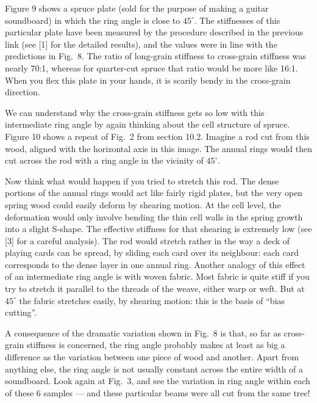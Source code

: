   Figure 9 shows a spruce plate (sold for the purpose of making a guitar 
  soundboard) in which the ring angle is close to $45^\circ$. The stiffnesses 
  of this particular plate have been measured by the procedure described in the 
  previous link (see [1] for the detailed results), and the values were in line 
  with the predictions in Fig.\ 8. The ratio of long-grain stiffness to 
  cross-grain stiffness was nearly 70:1, whereas for quarter-cut spruce that 
  ratio would be more like 16:1. When you flex this plate in your hands, it is 
  scarily bendy in the cross-grain direction. 


  We can understand why the cross-grain stiffness gets so low with this 
  intermediate ring angle by again thinking about the cell structure of spruce. 
  Figure 10 shows a repeat of Fig.\ 2 from section 10.2. Imagine a rod cut from 
  this wood, aligned with the horizontal axis in this image. The annual rings 
  would then cut across the rod with a ring angle in the vicinity of 
  $45^\circ$. 

  Now think what would happen if you tried to stretch this rod. The dense 
  portions of the annual rings would act like fairly rigid plates, but the very 
  open spring wood could easily deform by shearing motion. At the cell level, 
  the deformation would only involve bending the thin cell walls in the spring 
  growth into a slight S-shape. The effective stiffness for that shearing is 
  extremely low (see [3] for a careful analysis). The rod would stretch rather 
  in the way a deck of playing cards can be spread, by sliding each card over 
  its neighbour: each card corresponds to the dense layer in one annual ring. 
  Another analogy of this effect of an intermediate ring angle is with woven 
  fabric. Most fabric is quite stiff if you try to stretch it parallel to the 
  threads of the weave, either warp or weft. But at $45^\circ$ the fabric 
  stretches easily, by shearing motion: this is the basis of ``bias cutting''. 


  A consequence of the dramatic variation shown in Fig.\ 8 is that, so far as 
  cross-grain stiffness is concerned, the ring angle probably makes at least as 
  big a difference as the variation between one piece of wood and another. 
  Apart from anything else, the ring angle is not usually constant across the 
  entire width of a soundboard. Look again at Fig.\ 3, and see the variation in 
  ring angle within each of these 6 samples — and these particular beams were 
  all cut from the same tree! 

